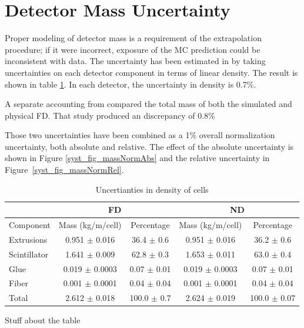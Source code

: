 {\begin{figure}
\end{figure}

\clearpage

\section{Detector Mass Uncertainty}

Proper modeling of detector mass is a requirement of the extrapolation
procedure; if it were incorrect, exposure of the MC prediction could
be inconsistent with data.
The uncertainty has been estimated in \cite{raddatz2016thesis}
by taking uncertainties on each detector component in terms of linear density.
The result is shown in table \ref{detector_density_table}.
In each detector, the uncertainty in density is 0.7\%.

A separate accounting from \cite{musser2014mass} compared
the total mass of both the simulated and physical FD.
That study produced an discrepancy of 0.8\%

Those two uncertainties have been combined as a
1\% overall normalization uncertainty, both absolute and relative.
The effect of the absolute uncertainty is shown in
Figure \ref{syst_fig_massNormAbs} and the relative uncertainty in
Figure~\ref{syst_fig_massNormRel}.


\begin{table}
\begin{center}
\begin{tabular}{|l|c|c|c|c|}
\hline
& \multicolumn{2}{C|}{FD} & \multicolumn{2}{c|}{ND} \\ \hline
Component    & Mass (kg/m/cell)   & Percentage & Mass (kg/m/cell) & Percentage \\ \hline
Extrusions   & 0.951 $\pm$ 0.016  & 36.4 $\pm$ 0.6  &  0.951 $\pm$ 0.016  & 36.2 $\pm$ 0.6 \\
Scintillator & 1.641 $\pm$ 0.009  & 62.8 $\pm$ 0.3  &  1.653 $\pm$ 0.011  & 63.0 $\pm$ 0.4 \\
Glue         & 0.019 $\pm$ 0.0003 & 0.07 $\pm$ 0.01 &  0.019 $\pm$ 0.0003 & 0.07 $\pm$ 0.01 \\
Fiber        & 0.001 $\pm$ 0.0001 & 0.04 $\pm$ 0.04 &  0.001 $\pm$ 0.0001 & 0.04 $\pm$ 0.04 \\ \hline
Total        & 2.612 $\pm$ 0.018  & 100.0 $\pm$ 0.7 &  2.624 $\pm$ 0.019  & 100.0 $\pm$ 0.07 \\ \hline
\end{tabular}
\end{center}
\caption{Uncertianties in density of \nova cells}{
Stuff about the table }
\label{detector_density_table}


\end{table}}

